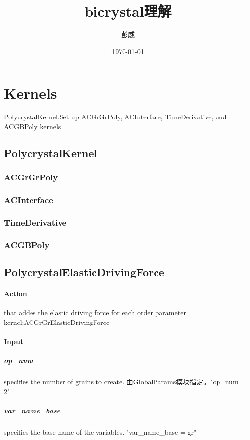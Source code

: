 \documentclass[UTF8]{ctexart}
\title{bicrystal理解}
\author{彭威}
\date{\today}
\begin{document}
\maketitle
\section{Kernels}
PolycrystalKernel:Set up ACGrGrPoly, ACInterface, TimeDerivative, and ACGBPoly kernels
\subsection{PolycrystalKernel}
\subsubsection{ACGrGrPoly}
\subsubsection{ACInterface}
\subsubsection{TimeDerivative}
\subsubsection{ACGBPoly}
\subsection{PolycrystalElasticDrivingForce}
\paragraph{Action}
that addes the elastic driving force for each order parameter. 
kernel:ACGrGrElasticDrivingForce
\paragraph{Input}
\subparagraph{op\_num}
specifies the number of grains to create. 由GlobalParams模块指定。"op\_num = 2"
\subparagraph{var\_name\_base}
specifies the base name of the variables. "var\_name\_base = gr"
\end{document}
